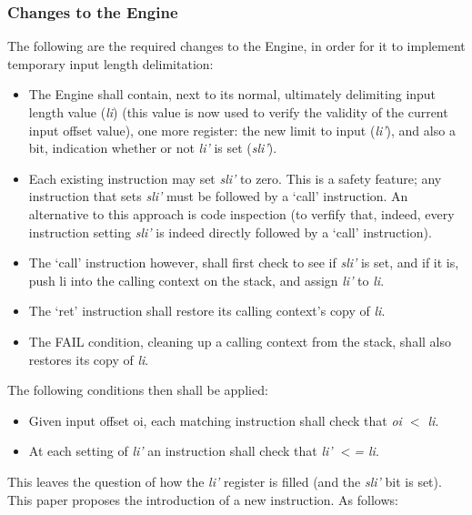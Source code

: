 \subsubsection{Changes to the Engine}


The following are the required changes to the Engine, in order for it to 
implement temporary input length delimitation:

\begin{itemize}
    \item The Engine shall contain, next to its normal, ultimately 
delimiting input length value (\textit{li})
(this value is now used to verify the 
validity of the current input offset value), one more register: the new 
limit to input (\textit{li’}), and also a bit, indication whether or
not \textit{li’} is set (\textit{sli’}).
    \item Each existing instruction may set \textit{sli’} to zero.
This is a safety 
feature; any instruction that sets \textit{sli’} must be followed by a ‘call’ 
instruction. An alternative to this approach is code inspection (to 
verfify that, indeed, every instruction setting \textit{sli’} is indeed
directly followed by a ‘call’ instruction).
    \item The ‘call’ instruction however, shall first check to see if 
\textit{sli’} is set, and if it is, push li into the calling context on the 
stack, and assign \textit{li’} to \textit{li}.
    \item The ‘ret’ instruction shall restore its calling context’s 
copy of \textit{li}.
    \item The FAIL condition, cleaning up a calling context from the stack, 
shall also restores its copy of \textit{li}.
\end{itemize}
The following conditions then shall be applied:
\begin{itemize}
    \item Given input offset oi, each matching instruction shall check that 
\textit{oi $<$ li}.
    \item At each setting of \textit{li’} an instruction shall check that
\textit{li’ $<$= li}.
\end{itemize}


This leaves the question of how the \textit{li’} register is filled (and the 
\textit{sli’} bit is set). This paper proposes the introduction of a new 
instruction. As follows:

